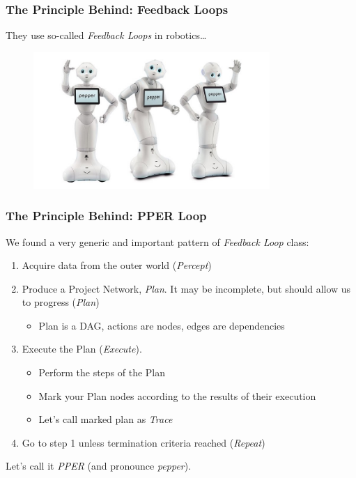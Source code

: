 \documentclass[usenames,dvipsnames]{beamer}
\begin{document}
\begin{frame}
\frametitle{The Principle Behind: Feedback Loops}
They use so-called \textit{Feedback Loops} in robotics\dots
\begin{figure}
    \includegraphics[width=0.8\textwidth]{media/robots.jpg}
\end{figure}
\end{frame}

\begin{frame}
    \frametitle{The Principle Behind: PPER Loop\footnotemark[1]}  
    
    We found a very generic and important pattern of \textit{Feedback Loop} class:
\begin{enumerate}
    \item Acquire data from the outer world (\textit{Percept})
    \item Produce a Project Network, \textit{Plan}. 
          It may be incomplete, but should allow us to progress (\textit{Plan})
          \begin{itemize}
            \item Plan is a DAG, actions are nodes, edges are dependencies       
          \end{itemize} 
    \item Execute the Plan (\textit{Execute}). 
    \begin{itemize}
        \item Perform the steps of the Plan
        \item Mark your Plan nodes according to the results of their execution    
        \item Let's call marked plan as \textit{Trace}
      \end{itemize} 
    \item Go to step 1 unless termination criteria reached (\textit{Repeat})
\end{enumerate}
Let's call it \textit{PPER} (and pronounce \textit{pepper}).
\end{frame}
\end{document}
